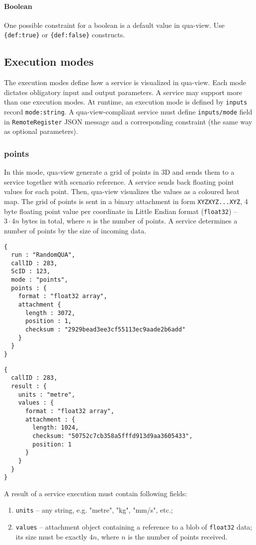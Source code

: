 \paragraph{Boolean}
One possible constraint for a boolean is a default value in qua-view.
Use \texttt{\{def:true\}} or \texttt{\{def:false\}} constructs.


\subsection{Execution modes}
The execution modes define how a service is visualized in qua-view.
Each mode dictates obligatory input and output parameters.
A service may support more than one execution modes.
At runtime, an execution mode is defined by \texttt{inputs} record \texttt{mode:string}.
A qua-view-compliant service must define \texttt{inputs/mode} field in \texttt{RemoteRegister} JSON message
and a corresponding constraint (the same way as optional parameters).

\subsubsection{points}
In this mode, qua-view generate a grid of points in 3D and sends them to a service together with scenario reference.
A service sends back floating point values for each point.
Then, qua-view visualizes the values as a coloured heat map.
The grid of points is sent in a binary attachment in form \texttt{XYZXYZ...XYZ}, 4 byte floating point value per coordinate
in Little Endian format (\texttt{float32}) -- $3 \cdot 4 n$ bytes in total, where $n$ is the number of points.
A service determines a number of points by the size of incoming data.
\begin{lstlisting}[caption={A qua-compliant service run request for mode \texttt{points}}, label={lst:quacompliantinput:points}]
{
  run : "RandomQUA",
  callID : 283,
  ScID : 123,
  mode : "points",
  points : {
    format : "float32 array",
    attachment {
      length : 3072,
      position : 1,
      checksum : "2929bead3ee3cf55113ec9aade2b6add"
    }
  }
}
\end{lstlisting}

\begin{lstlisting}[caption={A qua-compliant service output for mode \texttt{points}}, label={lst:quacompliantresult:points}]
{
  callID : 283,
  result : {
    units : "metre",
    values : {
      format : "float32 array",
      attachment : {
        length: 1024,
        checksum: "50752c7cb358a5fffd913d9aa3605433",
        position: 1
      }
    }
  }
}
\end{lstlisting}
A result of a service execution must contain following fields:
\begin{enumerate}
\item \texttt{units} -- any string, e.g. "metre", "kg", "mm/s", etc.;
\item \texttt{values} -- attachment object containing a reference to a blob of \texttt{float32} data;
 its size must be exactly $4 n$, where $n$ is the number of points received.
\end{enumerate}

